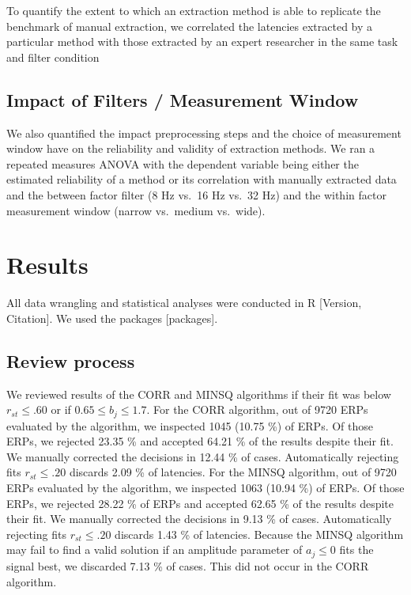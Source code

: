 \documentclass[
  man,floatsintext]{apa7}
\begin{document}
To quantify the extent to which an extraction method is able to replicate the benchmark of manual extraction, we correlated the latencies extracted by a particular method with those extracted by an expert researcher in the same task and filter condition

\hypertarget{impact-of-filters-measurement-window}{%
\subsection{Impact of Filters / Measurement Window}\label{impact-of-filters-measurement-window}}

We also quantified the impact preprocessing steps and the choice of measurement window have on the reliability and validity of extraction methods. We ran a repeated measures ANOVA with the dependent variable being either the estimated reliability of a method or its correlation with manually extracted data and the between factor filter (8 Hz vs.~16 Hz vs.~32 Hz) and the within factor measurement window (narrow vs.~medium vs.~wide).

\hypertarget{results}{%
\section{Results}\label{results}}

All data wrangling and statistical analyses were conducted in R {[}Version, Citation{]}. We used the packages {[}packages{]}.

\hypertarget{review-process}{%
\subsection{Review process}\label{review-process}}

We reviewed results of the CORR and MINSQ algorithms if their fit was below \(r_{st} \le .60\) or if \(0.65 \le b_j \le 1.7\). For the CORR algorithm, out of 9720 ERPs evaluated by the algorithm, we inspected 1045 (10.75 \%) of ERPs. Of those ERPs, we rejected 23.35 \% and accepted 64.21 \% of the results despite their fit. We manually corrected the decisions in 12.44 \% of cases. Automatically rejecting fits \(r_{st} \le .20\) discards 2.09 \% of latencies. For the MINSQ algorithm, out of 9720 ERPs evaluated by the algorithm, we inspected 1063 (10.94 \%) of ERPs. Of those ERPs, we rejected 28.22 \% of ERPs and accepted 62.65 \% of the results despite their fit. We manually corrected the decisions in 9.13 \% of cases. Automatically rejecting fits \(r_{st} \le .20\) discards 1.43 \% of latencies. Because the MINSQ algorithm may fail to find a valid solution if an amplitude parameter of \(a_j \le 0\) fits the signal best, we discarded 7.13 \% of cases. This did not occur in the CORR algorithm.
\end{document}
